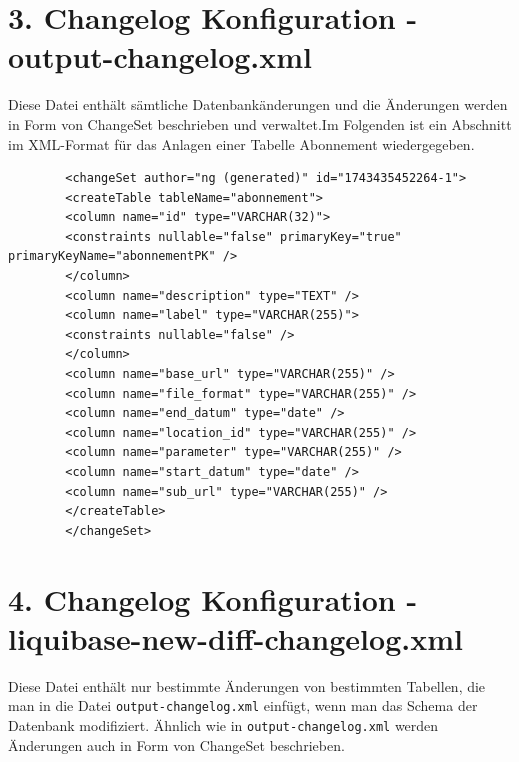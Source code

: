 \documentclass[a4paper,12pt]{scrreprt}
\begin{document}
	\section*{\small \textbf{3. Changelog Konfiguration - output-changelog.xml}}
	Diese Datei enthält sämtliche Datenbankänderungen und die Änderungen werden in Form von ChangeSet beschrieben und verwaltet.Im Folgenden ist ein Abschnitt im XML-Format für das Anlagen einer Tabelle Abonnement wiedergegeben. \\ 
	\begin{lstlisting}
		<changeSet author="ng (generated)" id="1743435452264-1">
		<createTable tableName="abonnement">
		<column name="id" type="VARCHAR(32)">
		<constraints nullable="false" primaryKey="true" primaryKeyName="abonnementPK" />
		</column>
		<column name="description" type="TEXT" />
		<column name="label" type="VARCHAR(255)">
		<constraints nullable="false" />
		</column>
		<column name="base_url" type="VARCHAR(255)" />
		<column name="file_format" type="VARCHAR(255)" />
		<column name="end_datum" type="date" />
		<column name="location_id" type="VARCHAR(255)" />
		<column name="parameter" type="VARCHAR(255)" />
		<column name="start_datum" type="date" />
		<column name="sub_url" type="VARCHAR(255)" />
		</createTable>
		</changeSet>
	\end{lstlisting}
	\section*{\small \textbf{4. Changelog Konfiguration - liquibase-new-diff-changelog.xml}}
	Diese Datei enthält nur bestimmte Änderungen von bestimmten Tabellen, die man in die Datei \texttt{output-changelog.xml} einfügt, wenn man das Schema der Datenbank modifiziert. Ähnlich wie in \texttt{output-changelog.xml} werden Änderungen auch in Form von ChangeSet beschrieben.
	
\end{document}
